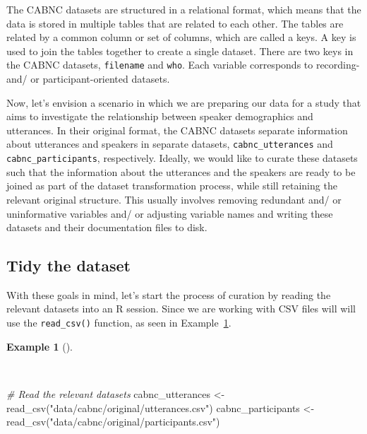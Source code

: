 \documentclass[
  letterpaper,
]{latex/krantz}
\newenvironment{Shaded}{\begin{snugshade}}{\end{snugshade}}
\newcommand{\CommentTok}[1]{\textcolor[rgb]{0.00,0.00,0.00}{\textit{#1}}}
\newcommand{\FunctionTok}[1]{\textcolor[rgb]{0.00,0.00,0.00}{#1}}
\newcommand{\NormalTok}[1]{\textcolor[rgb]{0.00,0.00,0.00}{#1}}
\newcommand{\OtherTok}[1]{\textcolor[rgb]{0.00,0.00,0.00}{#1}}
\newcommand{\StringTok}[1]{\textcolor[rgb]{0.00,0.00,0.00}{#1}}
\theoremstyle{definition}
\newtheorem{example}{Example}[chapter]
\theoremstyle{remark}
\begin{document}
The CABNC datasets are structured in a relational format, which means
that the data is stored in multiple tables that are related to each
other. The tables are related by a common column or set of columns,
which are called a keys. A key is used to join the tables together to
create a single dataset. There are two keys in the CABNC datasets,
\texttt{filename} and \texttt{who}. Each variable corresponds to
recording- and/ or participant-oriented datasets.

Now, let's envision a scenario in which we are preparing our data for a
study that aims to investigate the relationship between speaker
demographics and utterances. In their original format, the CABNC
datasets separate information about utterances and speakers in separate
datasets, \texttt{cabnc\_utterances} and \texttt{cabnc\_participants},
respectively. Ideally, we would like to curate these datasets such that
the information about the utterances and the speakers are ready to be
joined as part of the dataset transformation process, while still
retaining the relevant original structure. This usually involves
removing redundant and/ or uninformative variables and/ or adjusting
variable names and writing these datasets and their documentation files
to disk.

\subsection{Tidy the dataset}\label{tidy-the-dataset}

With these goals in mind, let's start the process of curation by reading
the relevant datasets into an R session. Since we are working with CSV
files will will use the \texttt{read\_csv()} function, as seen in
Example~\ref{exm-curate-cabnc-read}.

\begin{example}[]\protect\hypertarget{exm-curate-cabnc-read}{}\label{exm-curate-cabnc-read}

~

\begin{Shaded}
\begin{Highlighting}[]
\CommentTok{\# Read the relevant datasets}
\NormalTok{cabnc\_utterances }\OtherTok{\textless{}{-}}
  \FunctionTok{read\_csv}\NormalTok{(}\StringTok{"data/cabnc/original/utterances.csv"}\NormalTok{)}
\NormalTok{cabnc\_participants }\OtherTok{\textless{}{-}}
  \FunctionTok{read\_csv}\NormalTok{(}\StringTok{"data/cabnc/original/participants.csv"}\NormalTok{)}
\end{Highlighting}
\end{Shaded}

\end{example}
\end{document}
